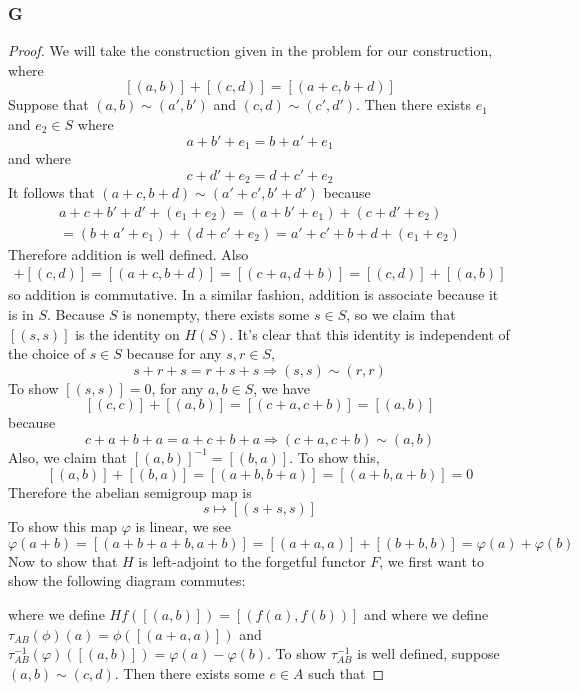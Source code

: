 \documentclass{article}
\DeclareMathOperator{\Hom}{\mathrm{Hom}}
\DeclareMathOperator{\Mor}{\mathrm{Mor}}
\begin{document}
\subsubsection{G}\label{1.5.G}
\begin{proof}
    We will take the construction given in the problem for our construction, where
    \[
    [(a,b)]+[(c,d)]=[(a+c,b+d)]
    \]
    Suppose that $(a,b)\sim (a',b')$ and $(c,d)\sim (c',d')$. Then there exists $e_1$ and $e_2\in S$ where
    \[
    a+b'+e_1=b+a'+e_1
    \]
    and where
    \[
    c+d'+e_2=d+c'+e_2
    \]
    It follows that $(a+c,b+d)\sim (a'+c',b'+d')$ because 
    \begin{align*}
        a+c+b'+d'+(e_1+e_2)=(a+b'+e_1)+(c+d'+e_2)\\
        =(b+a'+e_1)+(d+c'+e_2)=a'+c'+b+d+(e_1+e_2)
    \end{align*}
    Therefore addition is well defined. Also
    \begin{align*}
        [(a,b)]+[(c,d)]=[(a+c,b+d)]=[(c+a,d+b)]=[(c,d)]+[(a,b)]
    \end{align*}
    so addition is commutative. In a similar fashion, addition is associate because it is in $S$. Because $S$ is nonempty, there exists some $s\in S$, so we claim that $[(s,s)]$ is the identity on $H(S)$. It's clear that this identity is independent of the choice of $s\in S$ because for any $s,r\in S$,
    \[
    s+r+s=r+s+s\Rightarrow (s,s)\sim(r,r)
    \]
    To show $[(s,s)]=0$, for any $a,b\in S$, we have
    \[
    [(c,c)]+[(a,b)]=[(c+a,c+b)]=[(a,b)]
    \]
    because 
    \[
    c+a+b+a=a+c+b+a\Rightarrow (c+a,c+b)\sim (a,b)
    \]
    Also, we claim that $[(a,b)]^{-1}=[(b,a)]$. To show this,
    \[
    [(a,b)]+[(b,a)]=[(a+b,b+a)]=[(a+b,a+b)]=0
    \]
    Therefore the abelian semigroup map is
    \[
    s\mapsto [(s+s,s)]
    \]
    To show this map $\varphi$ is linear, we see
    \[
    \varphi(a+b)=[(a+b+a+b,a+b)]=[(a+a,a)]+[(b+b,b)]=\varphi(a)+\varphi(b)
    \]
    Now to show that $H$ is left-adjoint to the forgetful functor $F$, we first want to show the following diagram commutes:
    \begin{center}
    \end{center}
     where we define $Hf([(a,b)])=[(f(a),f(b))]$ and where we define $\tau_{AB}(\phi)(a)=\phi([(a+a,a)])$ and $\tau_{AB}^{-1}(\varphi)([(a,b)])=\varphi(a)-\varphi(b)$. To show $\tau_{AB}^{-1}$ is well defined, suppose $(a,b)\sim (c,d)$. Then there exists some $e\in A$ such that

\end{proof}
\end{document}
